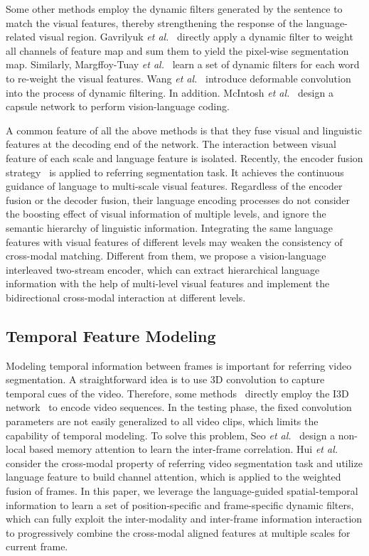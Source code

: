 \documentclass[10pt,twocolumn,letterpaper]{article}
\begin{document}
Some other methods employ the dynamic filters generated by the sentence to match the visual features, thereby strengthening the response of the language-related visual region. Gavrilyuk \emph{et al.}~\cite{gavrilyuk2018actor} directly apply a dynamic filter to weight all channels of feature map and sum them to yield the pixel-wise segmentation map.
Similarly, Margffoy-Tuay \emph{et al.}~\cite{margffoy2018dynamic} learn a set of dynamic filters for each word to re-weight the visual features. Wang \emph{et al.}~\cite{wang2020context} introduce deformable convolution~\cite{dai2017deformable} into the process of dynamic filtering. In addition. McIntosh \emph{et al.}~\cite{mcintosh2020visual} design a capsule network to perform vision-language coding.

A common feature of all the above methods is that they fuse visual and linguistic features at the decoding end of the network. The interaction between visual feature of each scale and language feature is isolated. Recently, the encoder fusion strategy~\cite{ningpolar,feng2021encoder,hui2021collaborative} is applied to referring segmentation task. It achieves the continuous guidance of language to multi-scale visual features. Regardless of the encoder fusion  or the decoder fusion, their language encoding processes do not consider the boosting effect of visual information of multiple levels, and ignore the semantic hierarchy of linguistic information. Integrating the same language features with visual features of different levels may weaken the consistency of cross-modal matching. Different from them, we propose a vision-language interleaved two-stream encoder,  which can extract hierarchical language information with the help of multi-level visual features and implement the bidirectional cross-modal interaction at different levels.

\subsection{Temporal Feature Modeling}
Modeling temporal information between frames is important for referring video segmentation. A straightforward idea is to use 3D convolution to capture temporal cues of the video. Therefore, some methods~\cite{gavrilyuk2018actor,wang2019asymmetric,wang2020context,mcintosh2020visual} directly employ the I3D network~\cite{carreira2017quo} to encode video sequences. In the testing phase, the fixed convolution parameters are not easily generalized to all video clips, which limits the capability of temporal modeling.
To solve this problem, Seo \emph{et al.}~\cite{seo2020urvos} design a non-local based memory attention to learn the inter-frame correlation. Hui \emph{et al.}~\cite{hui2021collaborative} consider the cross-modal property of  referring video segmentation task and utilize language feature to build channel attention, which is applied to the weighted fusion of frames. In this paper, we leverage the language-guided spatial-temporal information to learn a set of position-specific and frame-specific dynamic filters, which can  fully exploit the inter-modality and inter-frame information interaction to progressively combine the cross-modal aligned features at multiple scales for current frame.
\end{document}
